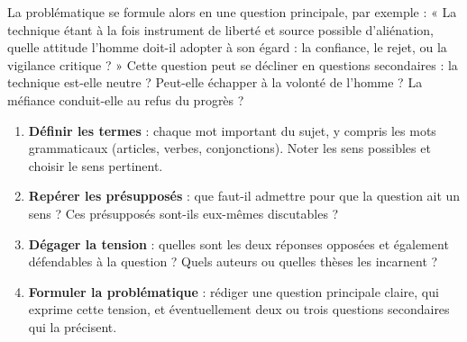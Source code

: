 \documentclass[11pt]{article}
\begin{document}
La problématique se formule alors en une question principale, par exemple : « La technique étant à la fois instrument de liberté et source possible d'aliénation, quelle attitude l'homme doit-il adopter à son égard : la confiance, le rejet, ou la vigilance critique ? » Cette question peut se décliner en questions secondaires : la technique est-elle neutre ? Peut-elle échapper à la volonté de l'homme ? La méfiance conduit-elle au refus du progrès ?

\begin{methode}
\begin{enumerate}
\item \textbf{Définir les termes} : chaque mot important du sujet, y compris les mots grammaticaux (articles, verbes, conjonctions). Noter les sens possibles et choisir le sens pertinent.
\item \textbf{Repérer les présupposés} : que faut-il admettre pour que la question ait un sens ? Ces présupposés sont-ils eux-mêmes discutables ?
\item \textbf{Dégager la tension} : quelles sont les deux réponses opposées et également défendables à la question ? Quels auteurs ou quelles thèses les incarnent ?
\item \textbf{Formuler la problématique} : rédiger une question principale claire, qui exprime cette tension, et éventuellement deux ou trois questions secondaires qui la précisent.
\end{enumerate}
\end{methode}
\end{document}
